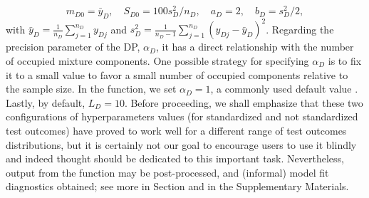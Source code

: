 \begin{equation*}
 m_{D0}=\bar{y}_D,\quad S_{D0}=100 s^2_D/n_D, \quad a_D=2, \quad b_D=s^2_D/2, 
\end{equation*}
with $\bar{y}_D=\frac{1}{n_D}\sum_{j=1}^{n_D}y_{Dj}$ and $s_D^2=\frac{1}{n_D-1}\sum_{j=1}^{n_D}(y_{Dj}-\bar{y}_D)^2$. Regarding the precision parameter of the DP, $\alpha_D$, it has a direct relationship with the number of occupied mixture components. One possible strategy for specifying $\alpha_D$ is to fix it to a small value to favor a small number of occupied components relative to the sample size. In the  function, we set $\alpha_D=1$, a commonly used default value \citep[][p.~553]{Gelman2013}. Lastly, by default, $L_D=10$. Before proceeding, we shall emphasize that these two configurations of hyperparameters values (for standardized and not standardized test outcomes) have proved to work well for a different range of test outcomes distributions, but it is certainly not our goal to encourage users to use it blindly and indeed thought should be dedicated to this important task. Nevertheless, output from the function  may be post-processed, and (informal) model fit diagnostics obtained; see more in Section  and in the Supplementary Materials.

